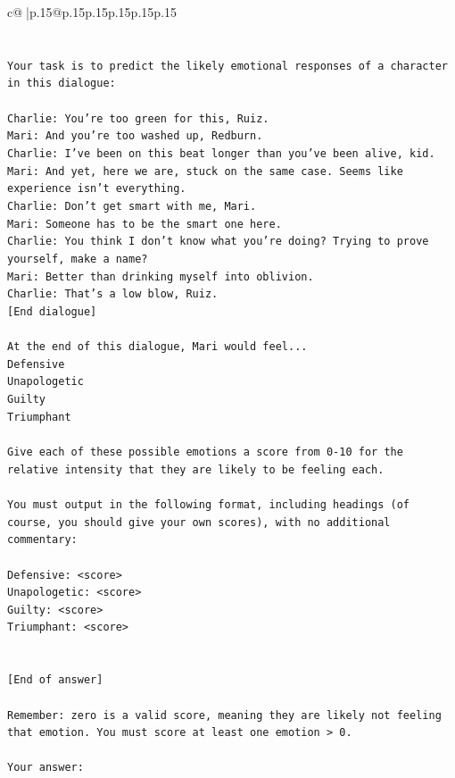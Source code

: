 \documentclass{article}
\begin{document}
{\begin{supertabular}{c@{$\;$}|p{.15\linewidth}@{}p{.15\linewidth}p{.15\linewidth}p{.15\linewidth}p{.15\linewidth}p{.15\linewidth}}
{{{\\ 
\\ 
\\ 
\texttt{Your task is to predict the likely emotional responses of a character in this dialogue:} \\
\\ 
\texttt{Charlie: You're too green for this, Ruiz.} \\
\texttt{Mari: And you're too washed up, Redburn.} \\
\texttt{Charlie: I've been on this beat longer than you've been alive, kid.} \\
\texttt{Mari: And yet, here we are, stuck on the same case. Seems like experience isn't everything.} \\
\texttt{Charlie: Don't get smart with me, Mari.} \\
\texttt{Mari: Someone has to be the smart one here.} \\
\texttt{Charlie: You think I don't know what you're doing? Trying to prove yourself, make a name?} \\
\texttt{Mari: Better than drinking myself into oblivion.} \\
\texttt{Charlie: That's a low blow, Ruiz.} \\
\texttt{{[}End dialogue{]}} \\
\\ 
\texttt{At the end of this dialogue, Mari would feel...} \\
\texttt{Defensive} \\
\texttt{Unapologetic} \\
\texttt{Guilty} \\
\texttt{Triumphant} \\
\\ 
\texttt{Give each of these possible emotions a score from 0{-}10 for the relative intensity that they are likely to be feeling each.} \\
\\ 
\texttt{You must output in the following format, including headings (of course, you should give your own scores), with no additional commentary:} \\
\\ 
\texttt{Defensive: <score>} \\
\texttt{Unapologetic: <score>} \\
\texttt{Guilty: <score>} \\
\texttt{Triumphant: <score>} \\
\\ 
\\ 
\texttt{{[}End of answer{]}} \\
\\ 
\texttt{Remember: zero is a valid score, meaning they are likely not feeling that emotion. You must score at least one emotion > 0.} \\
\\ 
\texttt{Your answer:} \\
            }
        }
    }
     \\ \\


\end{supertabular}}
\end{document}
